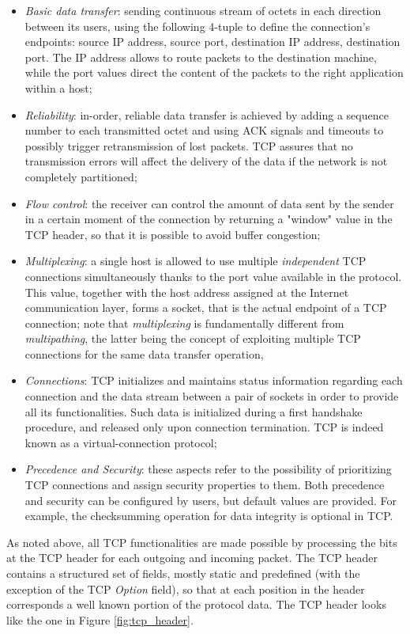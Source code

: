 \begin{itemize}
  \item \textit{Basic data transfer}: sending continuous stream of octets in each direction between its users, using the following 4-tuple to define the connection's endpoints: source IP address, source port, destination IP address, destination port. The IP address allows to route packets to the destination machine, while the port values direct the content of the packets to the right application within a host;
  \item \textit{Reliability}: in-order, reliable data transfer is achieved by adding a sequence number to each transmitted octet and using ACK signals and timeouts to possibly trigger retransmission of lost packets. TCP assures that no transmission errors will affect the delivery of the data if the network is not completely partitioned;
  \item \textit{Flow control}: the receiver can control the amount of data sent by the sender in a certain moment of the connection by returning a "window" value in the TCP header, so that it is possible to avoid buffer congestion;
  \item \textit{Multiplexing}: a single host is allowed to use multiple \textit{independent} TCP connections simultaneously thanks to the port value available in the protocol. This value, together with the host address assigned at the Internet communication layer, forms a socket, that is the actual endpoint of a TCP connection; note that \textit{multiplexing} is fundamentally different from \textit{multipathing}, the latter being the concept of exploiting multiple TCP connections for the same data transfer operation,
  \item \textit{Connections}: TCP initializes and maintains status information regarding each connection and the data stream between a pair of sockets in order to provide all its functionalities. Such data is initialized during a first handshake procedure, and released only upon connection termination. TCP is indeed known as a virtual-connection protocol;
  \item \textit{Precedence and Security}: these aspects refer to the possibility of prioritizing TCP connections and assign security properties to them. Both precedence and security can be configured by users, but default values are provided. For example, the checksumming operation for data integrity is optional in TCP.
\end{itemize}

As noted above, all TCP functionalities are made possible by processing the bits at the TCP header for each outgoing and incoming packet. The TCP header contains a structured set of fields, mostly static and predefined (with the exception of the TCP \textit{Option} field), so that at each position in the header corresponds a well known portion of the protocol data. The TCP header looks like the one in Figure \ref{fig:tcp_header}.


